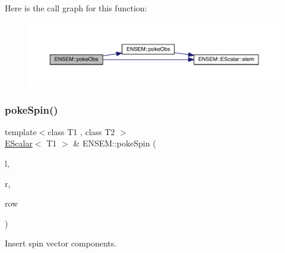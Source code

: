 Here is the call graph for this function\+:
\nopagebreak
\begin{figure}[H]
\begin{center}
\leavevmode
\includegraphics[width=350pt]{d4/dca/group__escalar_gad25640d827b75330c6d3f288290866fd_cgraph}
\end{center}
\end{figure}
\mbox{\label{group__escalar_gae8b2f2d3c5fedfb458392f11d78f2c88}} 
\subsubsection{\texorpdfstring{pokeSpin()}{pokeSpin()}\hspace{0.1cm}{\footnotesize\ttfamily [1/2]}}
{\footnotesize\ttfamily template$<$class T1 , class T2 $>$ \\
\mbox{\hyperlink{classENSEM_1_1EScalar}{E\+Scalar}}$<$ T1 $>$ \& E\+N\+S\+E\+M\+::poke\+Spin (\begin{DoxyParamCaption}\item[{\mbox{\hyperlink{classENSEM_1_1EScalar}{E\+Scalar}}$<$ T1 $>$ \&}]{l,  }\item[{const \mbox{\hyperlink{classENSEM_1_1EScalar}{E\+Scalar}}$<$ T2 $>$ \&}]{r,  }\item[{int}]{row }\end{DoxyParamCaption})\hspace{0.3cm}{\ttfamily [inline]}}



Insert spin vector components. 

